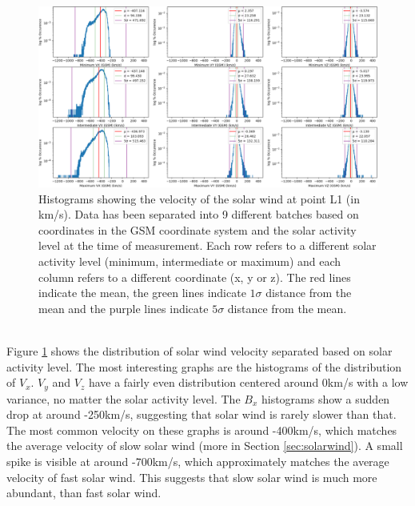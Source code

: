 \documentclass[12pt]{article}
\begin{document}
        \begin{figure}[t!]
            \centering
            \includegraphics[width=\textwidth]{fig_theory/hist_sw_velocity.png}
            \caption{Histograms showing the velocity of the solar wind at point L1 (in km/s). Data has been separated into 9 different batches based on coordinates in the GSM coordinate system and the solar activity level at the time of measurement. Each row refers to a different solar activity level (minimum, intermediate or maximum) and each column refers to a different coordinate (x, y or z). The red lines indicate the mean, the green lines indicate $1\sigma$ distance from the mean and the purple lines indicate $5\sigma$ distance from the mean.}
            \label{fig:hist_sw}
        \end{figure}\\
        Figure \ref{fig:hist_sw} shows the distribution of solar wind velocity separated based on solar activity level. The most interesting graphs are the histograms of the distribution of $V_x$. $V_y$ and $V_z$ have a fairly even distribution centered around 0km/s with a low variance, no matter the solar activity level. The $B_x$ histograms show a sudden drop at around -250km/s, suggesting that solar wind is rarely slower than that. The most common velocity on these graphs is around -400km/s, which matches the average velocity of slow solar wind\cite{2001russell} (more in Section \ref{sec:solarwind}). A small spike is visible at around -700km/s, which approximately matches the average velocity of fast solar wind\cite{2001russell}. This suggests that slow solar wind is much more abundant, than fast solar wind.
\end{document}
